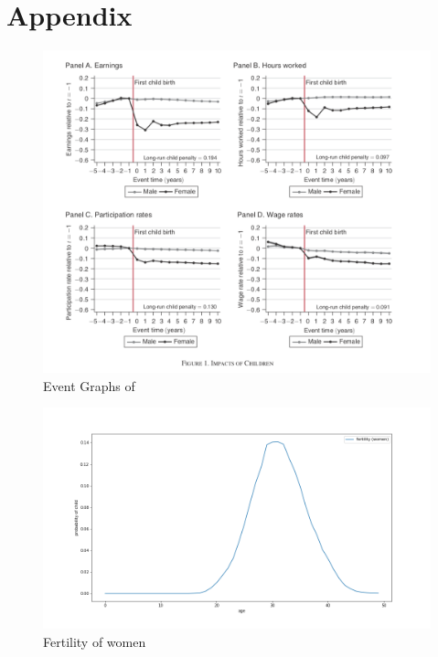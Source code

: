 \section*{Appendix}

\listoffigures
\listoftables

\begin{figure}
    \centering
    \includegraphics[scale=0.3]{figures/kleven_10_years_impact.png}
    \caption{Event Graphs of \textcite{kleven_children_2019}}
    \label{fig:my_label}
\end{figure}

\begin{figure}
    \centering
    \includegraphics[scale=0.4]{figures/fertility_women_empirical.png}
    \caption{Fertility of women}
    \label{fig:fertility_by_women}
\end{figure}

